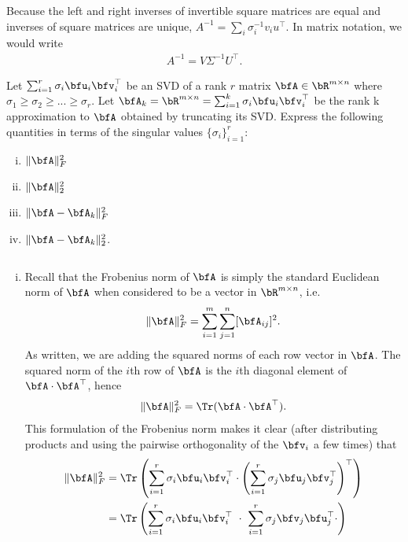 \begin{homework}[e]
\begin{prf}
  \bigskip
  
  Because the left and right inverses of invertible square matrices are equal and inverses of square matrices are unique, $A^{-1} = \sum_i \sigma_i^{-1}v_iu^{\top}$. In matrix notation, we would write
  \begin{align*}
    A^{-1} = V\Sigma^{-1} U^\top.
  \end{align*}
  \end{prf}
  \prob Let $\sum_{i=1}^r \sigma_i\bfu_i\bfv_i^\top$ be an SVD of a rank $r$ matrix $\bfA \in \bR^{m\times n}$ where $\sigma_1\geq \sigma_2\geq ...\geq \sigma_r$. Let $\bfA_k = \bR^{m\times n} = \sum_{i=1}^k \sigma_i\bfu_i\bfv_i^\top$ be the rank k approximation to $\bfA$ obtained by truncating its SVD. Express the following quantities in terms of the singular values $\{\sigma_i\}_{i=1}^r$:
  \begin{enumerate}[(i)]
    \item $\|\bfA\|_F^2$
    \item $\|\bfA\|_2^2$
    \item $\|\bfA - \bfA_k\|^2_F$
    \item $\|\bfA - \bfA_k\|_2^2$.
  \end{enumerate}
  \begin{prf}
    $ $
    \begin{enumerate}[(i)]
      \item Recall that the Frobenius norm of $\bfA$ is simply the standard Euclidean norm of $\bfA$ when considered to be a vector in $\bR^{m\times n}$, i.e.
        \begin{align*}
          \|\bfA\|_F^2 = \sum_{i=1}^m\sum_{j=1}^n [\bfA_{ij}]^2.
        \end{align*}
        As written, we are adding the squared norms of each row vector in $\bfA$. The squared norm of the $i$th row of $\bfA$ is the $i$th diagonal element of $\bfA\cdot\bfA^\top$, hence
        \begin{align*}
          \|\bfA\|_F^2 = \Tr(\bfA\cdot \bfA^\top).
        \end{align*}
        This formulation of the Frobenius norm makes it clear (after distributing products and using the pairwise orthogonality of the $\bfv_i$ a few times) that
        \begin{align*}
          \|\bfA\|_F^2 
            &= \Tr\left(\sum_{i=1}^r \sigma_i\bfu_i\bfv_i^\top \cdot \left(\sum_{i=1}^r \sigma_j\bfu_j\bfv_j^\top\right)^\top\right) \\
            &= \Tr\left(\sum_{i=1}^r \sigma_i\bfu_i\bfv_i^\top ~ \cdot ~ \sum_{i=1}^r \sigma_j\bfv_j\bfu_j^\top\cdot \right) \\

\end{align*}
\end{enumerate}
\end{prf}
\end{homework}
